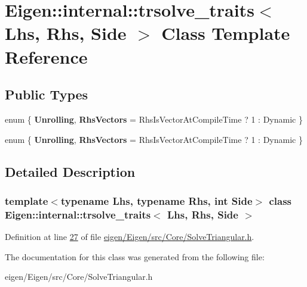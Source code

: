 \hypertarget{class_eigen_1_1internal_1_1trsolve__traits}{}\section{Eigen\+:\+:internal\+:\+:trsolve\+\_\+traits$<$ Lhs, Rhs, Side $>$ Class Template Reference}
\label{class_eigen_1_1internal_1_1trsolve__traits}
\subsection*{Public Types}
\begin{DoxyCompactItemize}
\item 
\mbox{\label{class_eigen_1_1internal_1_1trsolve__traits_a68c1e40262af973d963ddce8b532e318}} 
enum \{ {\bfseries Unrolling}, 
{\bfseries Rhs\+Vectors} = Rhs\+Is\+Vector\+At\+Compile\+Time ? 1 \+: Dynamic
 \}
\item 
\mbox{\label{class_eigen_1_1internal_1_1trsolve__traits_adab4f452baa3a7c580e1035c73197c58}} 
enum \{ {\bfseries Unrolling}, 
{\bfseries Rhs\+Vectors} = Rhs\+Is\+Vector\+At\+Compile\+Time ? 1 \+: Dynamic
 \}
\end{DoxyCompactItemize}


\subsection{Detailed Description}
\subsubsection*{template$<$typename Lhs, typename Rhs, int Side$>$\newline
class Eigen\+::internal\+::trsolve\+\_\+traits$<$ Lhs, Rhs, Side $>$}



Definition at line \hyperlink{eigen_2_eigen_2src_2_core_2_solve_triangular_8h_source_l00027}{27} of file \hyperlink{eigen_2_eigen_2src_2_core_2_solve_triangular_8h_source}{eigen/\+Eigen/src/\+Core/\+Solve\+Triangular.\+h}.



The documentation for this class was generated from the following file\+:\begin{DoxyCompactItemize}
\item 
eigen/\+Eigen/src/\+Core/\+Solve\+Triangular.\+h\end{DoxyCompactItemize}
